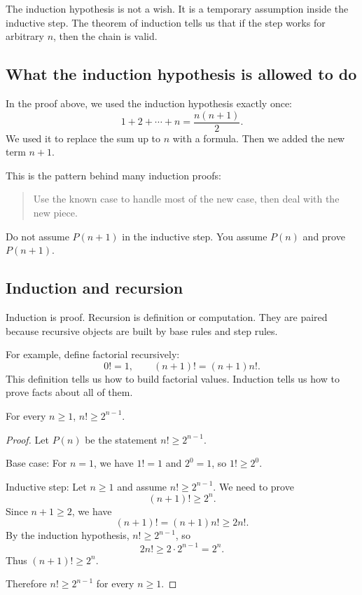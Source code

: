 The induction hypothesis is not a wish. It is a temporary assumption inside the inductive step. The theorem of induction tells us that if the step works for arbitrary $n$, then the chain is valid.

\subsection{What the induction hypothesis is allowed to do}

In the proof above, we used the induction hypothesis exactly once:
\[
1+2+\cdots+n=\frac{n(n+1)}{2}.
\]
We used it to replace the sum up to $n$ with a formula. Then we added the new term $n+1$.

This is the pattern behind many induction proofs:

\begin{quote}
Use the known case to handle most of the new case, then deal with the new piece.
\end{quote}

\begin{trapbox}
Do not assume $P(n+1)$ in the inductive step. You assume $P(n)$ and prove $P(n+1)$.
\end{trapbox}

\subsection{Induction and recursion}

Induction is proof. Recursion is definition or computation. They are paired because recursive objects are built by base rules and step rules.

For example, define factorial recursively:
\[
0!=1,\qquad (n+1)!=(n+1)n!.
\]
This definition tells us how to build factorial values. Induction tells us how to prove facts about all of them.

\begin{theorem}
For every $n\geq1$, $n!\geq 2^{n-1}$.
\end{theorem}

\begin{proof}
Let $P(n)$ be the statement $n!\geq2^{n-1}$.

Base case: For $n=1$, we have $1!=1$ and $2^{0}=1$, so $1!\geq2^0$.

Inductive step: Let $n\geq1$ and assume $n!\geq2^{n-1}$. We need to prove
\[
(n+1)!\geq2^n.
\]
Since $n+1\geq2$, we have
\[
(n+1)!=(n+1)n!\geq2n!.
\]
By the induction hypothesis, $n!\geq2^{n-1}$, so
\[
2n!\geq2\cdot2^{n-1}=2^n.
\]
Thus $(n+1)!\geq2^n$.

Therefore $n!\geq2^{n-1}$ for every $n\geq1$.
\end{proof}

